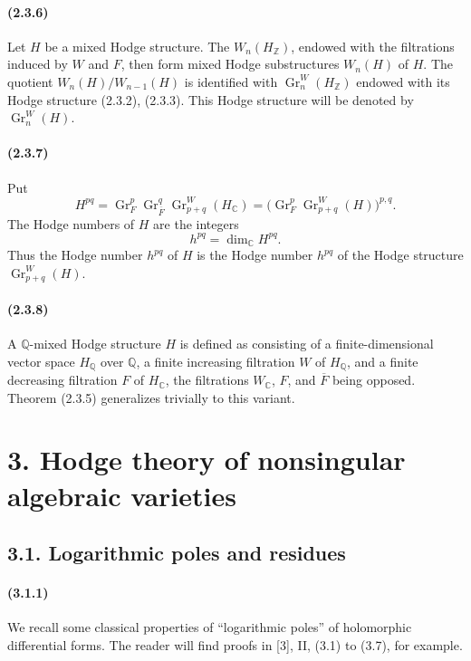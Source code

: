 \documentclass[10pt]{article}
\newcommand{\C}{\mathbb C}
\newcommand{\Q}{\mathbb Q}
\newcommand{\Z}{\mathbb Z}
\newcommand{\Gr}{\operatorname{Gr}}
\begin{document}
\paragraph{(2.3.6)} Let $H$ be a mixed Hodge structure. The $W_n(H_\Z)$, endowed with the filtrations induced by $W$ and $F$, then form mixed Hodge substructures $W_n(H)$ of $H$. The quotient $W_n(H)/W_{n-1}(H)$ is identified with $\Gr_n^W(H_\Z)$ endowed with its Hodge structure (2.3.2), (2.3.3). This Hodge structure will be denoted by $\Gr_n^W(H)$.

\paragraph{(2.3.7)} Put
\[
H^{pq}=\Gr_F^p\Gr_{\overline F}^q\Gr_{p+q}^W(H_\C)
       =\bigl(\Gr_F^p\Gr_{p+q}^W(H)\bigr)^{p,q}.
\]
The Hodge numbers of $H$ are the integers
\[
h^{pq}=\dim_\C H^{pq}.
\]
Thus the Hodge number $h^{pq}$ of $H$ is the Hodge number $h^{pq}$ of the Hodge structure $\Gr_{p+q}^W(H)$.

\paragraph{(2.3.8)} A $\Q$-mixed Hodge structure $H$ is defined as consisting of a finite-dimensional vector space $H_\Q$ over $\Q$, a finite increasing filtration $W$ of $H_\Q$, and a finite decreasing filtration $F$ of $H_\C$, the filtrations $W_\C$, $F$, and $\overline F$ being opposed. Theorem (2.3.5) generalizes trivially to this variant.

\section*{3. Hodge theory of nonsingular algebraic varieties}

\subsection*{3.1. Logarithmic poles and residues}

\paragraph{(3.1.1)} We recall some classical properties of ``logarithmic poles'' of holomorphic differential forms. The reader will find proofs in [3], II, (3.1) to (3.7), for example.
\end{document}
